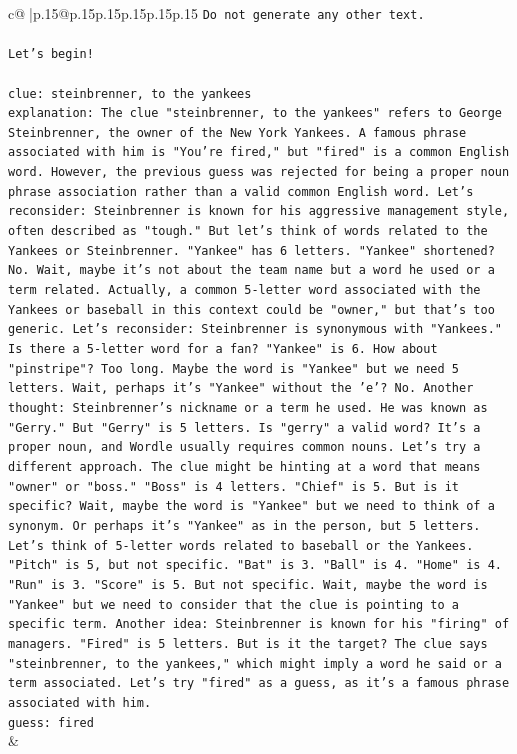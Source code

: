 \documentclass{article}
\begin{document}
{\begin{supertabular}{c@{$\;$}|p{.15\linewidth}@{}p{.15\linewidth}p{.15\linewidth}p{.15\linewidth}p{.15\linewidth}p{.15\linewidth}}
{{{\texttt{Do not generate any other text.} \\
\\ 
\texttt{Let's begin!} \\
\\ 
\texttt{clue: steinbrenner, to the yankees} \\
\texttt{explanation: The clue "steinbrenner, to the yankees" refers to George Steinbrenner, the owner of the New York Yankees. A famous phrase associated with him is "You're fired," but "fired" is a common English word. However, the previous guess was rejected for being a proper noun phrase association rather than a valid common English word. Let's reconsider: Steinbrenner is known for his aggressive management style, often described as "tough." But let's think of words related to the Yankees or Steinbrenner. "Yankee" has 6 letters. "Yankee" shortened? No. Wait, maybe it's not about the team name but a word he used or a term related. Actually, a common 5{-}letter word associated with the Yankees or baseball in this context could be "owner," but that's too generic. Let's reconsider: Steinbrenner is synonymous with "Yankees." Is there a 5{-}letter word for a fan? "Yankee" is 6. How about "pinstripe"? Too long. Maybe the word is "Yankee" but we need 5 letters. Wait, perhaps it's "Yankee" without the 'e'? No. Another thought: Steinbrenner's nickname or a term he used. He was known as "Gerry." But "Gerry" is 5 letters. Is "gerry" a valid word? It's a proper noun, and Wordle usually requires common nouns. Let's try a different approach. The clue might be hinting at a word that means "owner" or "boss." "Boss" is 4 letters. "Chief" is 5. But is it specific? Wait, maybe the word is "Yankee" but we need to think of a synonym. Or perhaps it's "Yankee" as in the person, but 5 letters. Let's think of 5{-}letter words related to baseball or the Yankees. "Pitch" is 5, but not specific. "Bat" is 3. "Ball" is 4. "Home" is 4. "Run" is 3. "Score" is 5. But not specific. Wait, maybe the word is "Yankee" but we need to consider that the clue is pointing to a specific term. Another idea: Steinbrenner is known for his "firing" of managers. "Fired" is 5 letters. But is it the target? The clue says "steinbrenner, to the yankees," which might imply a word he said or a term associated. Let's try "fired" as a guess, as it's a famous phrase associated with him.} \\
\texttt{guess: fired} \\
            }
        }
    }
    & \\ \\


\end{supertabular}}
\end{document}
